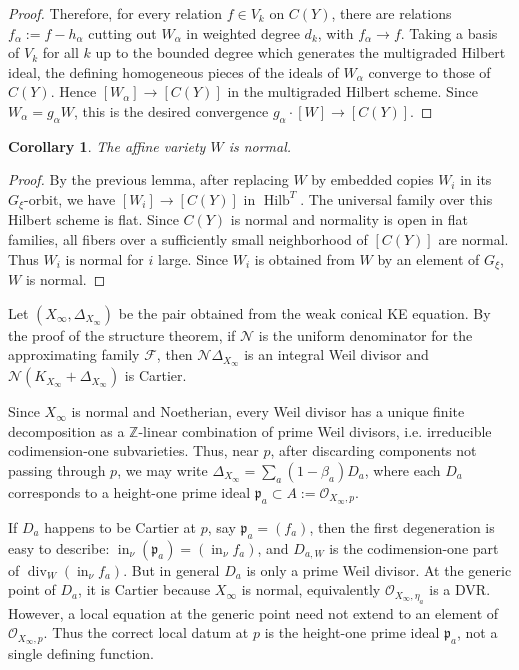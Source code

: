 \documentclass[11pt]{amsart}
\newtheorem{corollary}[theorem]{Corollary}
\theoremstyle{definition}
\theoremstyle{remark}
\begin{document}
\begin{proof}
Therefore, for every relation $f\in V_k$ on $C(Y)$, there are relations
$f_\alpha:=f-h_\alpha$ cutting out $W_\alpha$ in weighted degree $d_k$, with
$f_\alpha\to f$. Taking a basis of $V_k$ for all $k$ up to the bounded degree
which generates the multigraded Hilbert ideal, the defining homogeneous pieces
of the ideals of $W_\alpha$ converge to those of $C(Y)$. Hence
$[W_\alpha]\to[C(Y)]$ in the multigraded Hilbert scheme. Since
$W_\alpha=g_\alpha W$, this is the desired convergence
$g_\alpha\cdot[W]\to[C(Y)]$.
\end{proof}

\begin{corollary}The affine variety $W$ is normal.\end{corollary}

\begin{proof}
By the previous lemma, after replacing $W$ by embedded copies $W_i$ in its
$G_\xi$-orbit, we have $[W_i]\to[C(Y)]$ in $\operatorname{Hilb}^T$.
The universal family over this Hilbert scheme is flat. Since $C(Y)$ is normal and normality is open in flat families, all fibers over a sufficiently small neighborhood of $[C(Y)]$ are normal. Thus $W_i$ is normal for $i$ large. Since $W_i$ is obtained from $W$ by an element of $G_\xi$, $W$ is normal.
\end{proof}

Let $(X_\infty,\Delta_{X_\infty})$ be the pair obtained from the weak conical KE equation. By the proof of the structure theorem, if $\mathcal N$ is the uniform denominator for the approximating family $\mathcal F$, then $\mathcal N\Delta_{X_\infty}$ is an integral Weil divisor and $\mathcal N(K_{X_\infty}+\Delta_{X_\infty})$ is Cartier. 

Since $X_\infty$ is normal and Noetherian, every Weil divisor has a unique finite decomposition as a $\mathbb Z$-linear combination of prime Weil divisors, i.e. irreducible codimension-one subvarieties. Thus, near $p$, after discarding components not passing through $p$, we may write $\Delta_{X_\infty}=\sum_a(1-\beta_a)D_a$, where each $D_a$ corresponds to a height-one prime ideal $\mathfrak p_a\subset A:=\mathcal O_{X_\infty,p}$.

If $D_a$ happens to be Cartier at $p$, say $\mathfrak p_a=(f_a)$, then the first degeneration is easy to describe: $\operatorname{in}_\nu(\mathfrak p_a)=(\operatorname{in}_\nu f_a)$, and $D_{a,W}$ is the codimension-one part of $\operatorname{div}_W(\operatorname{in}_\nu f_a)$. But in general $D_a$ is only a prime Weil divisor. At the generic point of $D_a$, it is Cartier because $X_\infty$ is normal, equivalently $\mathcal O_{X_\infty,\eta_a}$ is a DVR. However, a local equation at the generic point need not extend to an element of $\mathcal O_{X_\infty,p}$. Thus the correct local datum at $p$ is the height-one prime ideal $\mathfrak p_a$, not a single defining function. 
\end{document}
